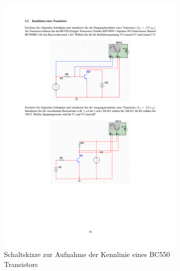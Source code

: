 \documentclass[12pt,a4paper]{article}
\begin{document}
\begin{figure}[H]
        \centering
        \begin{subfigure}[b]{0.48\textwidth}
               \includegraphics[trim = 30mm 175mm 30mm 40mm, clip, scale = 0.7]{ep5_14[Page16].pdf}
				\caption[Schaltskizze zur Aufnahme der Kennlinie eines BC550 Transistors]{Schaltskizze zur Aufnahme der Kennlinie eines BC550 Transistors\footnotemark}
 				 \label{fig:1}
        \end{subfigure}%
        \hfill
        \begin{subfigure}[b]{0.48\textwidth}

\end{subfigure}
\end{figure}
\end{document}
